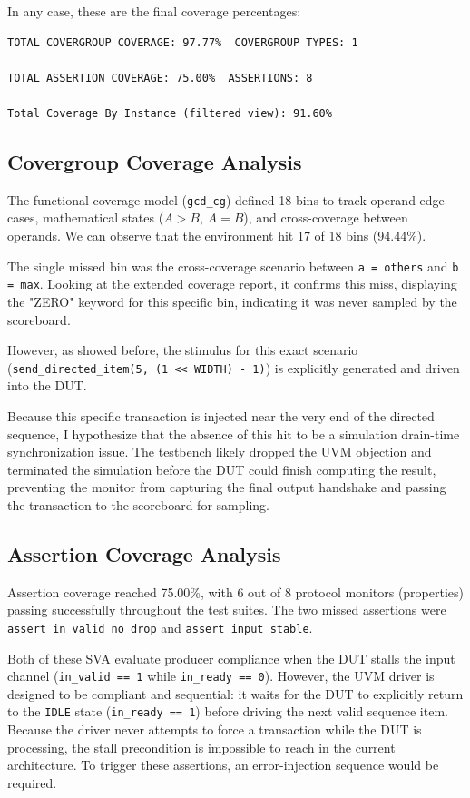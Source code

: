 In any case, these are the final coverage percentages:
\begin{verbatim}
TOTAL COVERGROUP COVERAGE: 97.77%  COVERGROUP TYPES: 1
 
TOTAL ASSERTION COVERAGE: 75.00%  ASSERTIONS: 8
 
Total Coverage By Instance (filtered view): 91.60%
\end{verbatim}

\subsection{Covergroup Coverage Analysis}
The functional coverage model (\texttt{gcd\_cg}) defined 18 bins to track operand edge cases, mathematical states ($A > B$, $A = B$), and cross-coverage between operands. We can observe that the environment hit 17 of 18 bins (94.44\%). 

The single missed bin was the cross-coverage scenario between \texttt{a = others} and \texttt{b = max}. Looking at the extended coverage report, it confirms this miss, displaying the "ZERO" keyword for this specific bin, indicating it was never sampled by the scoreboard. 

However, as showed before, the stimulus for this exact scenario (\texttt{send\_directed\_item(5, (1 << WIDTH) - 1)}) is explicitly generated and driven into the DUT. 

Because this specific transaction is injected near the very end of the directed sequence, I hypothesize that the absence of this hit to be a simulation drain-time synchronization issue. The testbench likely dropped the UVM objection and terminated the simulation before the DUT could finish computing the result, preventing the monitor from capturing the final output handshake and passing the transaction to the scoreboard for sampling.

\subsection{Assertion Coverage Analysis}
Assertion coverage reached 75.00\%, with 6 out of 8 protocol monitors (properties) passing successfully throughout the test suites. The two missed assertions were \texttt{assert\_in\_valid\_no\_drop} and \texttt{assert\_input\_stable}. 

Both of these SVA evaluate producer compliance when the DUT stalls the input channel (\texttt{in\_valid == 1} while \texttt{in\_ready == 0}). However, the UVM driver is designed to be  compliant and sequential: it waits for the DUT to explicitly return to the \texttt{IDLE} state (\texttt{in\_ready == 1}) before driving the next valid sequence item. Because the driver never attempts to force a transaction while the DUT is processing, the stall precondition is impossible to reach in the current architecture. To trigger these assertions, an error-injection sequence would be required.

